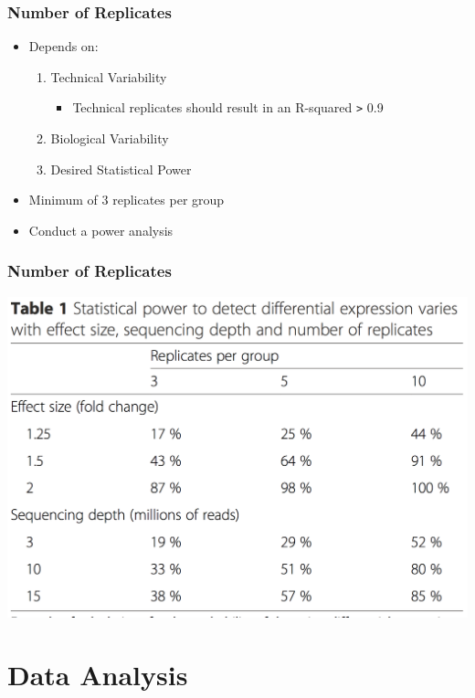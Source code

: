 \documentclass[14pt]{beamer}
\begin{document}
\begin{frame}
\frametitle{Number of Replicates}
\begin{itemize}
	\item<1-> Depends on:
	\begin{enumerate}
	\item<2-> Technical Variability
	\begin{itemize}
		\item<3-> Technical replicates should result in an R-squared \texttt{>} 0.9
	\end{itemize}
	\item<4-> Biological Variability
	\item<5-> Desired Statistical Power
	\end{enumerate}
	\item<6-> Minimum of 3 replicates per group
	\item<7-> Conduct a power analysis
\end{itemize}
\end{frame}

\begin{frame}
\frametitle{Number of Replicates}
	\begin{center}
    	\includegraphics[width=.8\textwidth]{images_20171003_power_analysis.png}
    \end{center}
\end{frame}


\section{Data Analysis}

\end{document}
